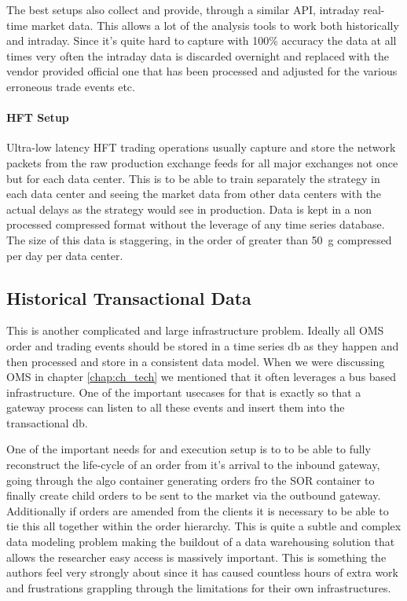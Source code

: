 The best setups also collect and provide, through a similar API, intraday real-time market data. This allows a lot of the analysis tools to work both historically and intraday. Since it's quite hard to capture with 100\% accuracy the data at all times very often the intraday data is discarded overnight and replaced with the vendor provided official one that has been processed and adjusted for the various erroneous trade events etc. 


\paragraph{HFT Setup}

Ultra-low latency HFT trading operations usually capture and store the network packets from the raw production exchange feeds for all major exchanges not once but for each data center. This is to be able to train separately the strategy in each data center and seeing the market data from other data centers with the actual delays as the strategy would see in production. Data is kept in a non processed compressed format without the leverage of any time series database. The size of this data is staggering, in the order of greater than 50~g compressed per day per data center.



\subsection{Historical Transactional Data}

This is another complicated and large infrastructure problem. Ideally all OMS order and trading events should be stored in a time series db as they happen and then processed and store in a consistent data model. When we were discussing OMS in chapter \ref{chap:ch_tech} we mentioned that it often leverages a bus based infrastructure. One of the important usecases for that is exactly so that a gateway process can listen to all these events and insert them into the transactional db.


One of the important needs for and execution setup is to to be able to fully reconstruct the life-cycle of an order from it's arrival to the inbound gateway, going through the algo container generating orders fro the SOR container to finally create child orders to be sent to the market via the outbound gateway. Additionally if orders are amended from the clients it is necessary to be able to tie this all together within the order hierarchy. This is quite a subtle and complex data modeling problem making the buildout of a data warehousing solution that allows the researcher easy access is massively important. This is something the authors feel very strongly about since it has caused countless hours of extra work and frustrations grappling through the limitations for their own infrastructures.


